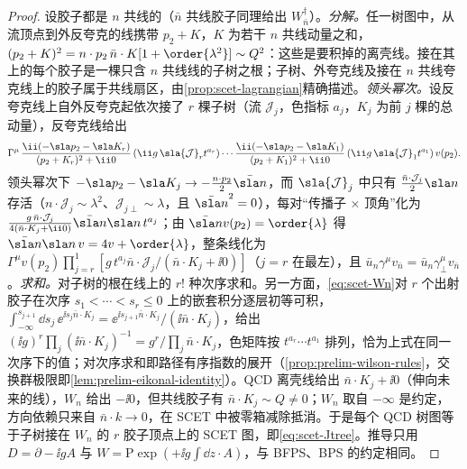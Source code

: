 \begin{proof}
设胶子都是 $n$ 共线的（$\bar n$ 共线胶子同理给出 $W_{\bar n}^\dagger$）。\emph{分解。}任一树图中，从流顶点到外反夸克的线携带 $p_2+K$，$K$ 为若干 $n$ 共线动量之和，$(p_2+K)^2=n\cdot p_2\,\bar n\cdot K[1+\order{\lambda^2}]\sim Q^2$：这些是要积掉的离壳线。接在其上的每个胶子是一棵只含 $n$ 共线线的子树之根；子树、外夸克线及接在 $n$ 共线夸克线上的胶子属于共线扇区，由\cref{prop:scet-lagrangian}精确描述。\emph{领头幂次。}设反夸克线上自外反夸克起依次接了 $r$ 棵子树（流 $\mathcal J_j$，色指标 $a_j$，$K_j$ 为前 $j$ 棵的总动量），反夸克线给出
\[
\Gamma^\mu\,\frac{\ii(-\sla p_2-\sla K_r)}{(p_2+K_r)^2+\ii0}\,(\ii g\,\sla{\mathcal J}_r t^{a_r})\cdots\frac{\ii(-\sla p_2-\sla K_1)}{(p_2+K_1)^2+\ii0}\,(\ii g\,\sla{\mathcal J}_1t^{a_1})\,v(p_2).
\]
领头幂次下 $-\sla p_2-\sla K_j\to-\frac{n\cdot p_2}{2}\bar{\sla n}$，而 $\sla{\mathcal J}_j$ 中只有 $\frac{\bar n\cdot\mathcal J_j}{2}\sla n$ 存活（$n\cdot\mathcal J_j\sim\lambda^2$、$\mathcal J_{j\perp}\sim\lambda$，且 $\bar{\sla n}^2=0$），每对“传播子 × 顶角”化为 $\frac{g\,\bar n\cdot\mathcal J_j}{4(\bar n\cdot K_j+\ii0)}\bar{\sla n}\sla n\,t^{a_j}$；由 $\bar{\sla n}v(p_2)=\order{\lambda}$ 得 $\bar{\sla n}\sla n\,v=4v+\order{\lambda}$，整条线化为 $\Gamma^\mu v(p_2)\prod_{j=r}^{1}[g\,t^{a_j}\bar n\cdot\mathcal J_j/(\bar n\cdot K_j+\ii0)]$（$j=r$ 在最左），且 $\bar u_n\gamma^\mu v_{\bar n}=\bar u_n\gamma_\perp^\mu v_{\bar n}$。\emph{求和。}对子树的根在线上的 $r!$ 种次序求和。另一方面，\cref{eq:scet-Wn}对 $r$ 个出射胶子在次序 $s_1<\cdots<s_r\le0$ 上的嵌套积分逐层初等可积，$\int_{-\infty}^{s_{j+1}}\dd s_j\,\ee^{\ii s_j\bar n\cdot K_j}=\ee^{\ii s_{j+1}\bar n\cdot K_j}/(\ii\bar n\cdot K_j)$，给出 $(\ii g)^r\prod_j(\ii\bar n\cdot K_j)^{-1}=g^r/\prod_j\bar n\cdot K_j$，色矩阵按 $t^{a_r}\cdots t^{a_1}$ 排列，恰为上式在同一次序下的值；对次序求和即路径有序指数的展开（\cref{prop:prelim-wilson-rules}，交换群极限即\cref{lem:prelim-eikonal-identity}）。QCD 离壳线给出 $\bar n\cdot K_j+\ii0$（伸向未来的线），$W_n$ 给出 $-\ii0$，但共线胶子有 $\bar n\cdot K_j\sim Q\neq0$；$W_n$ 取自 $-\infty$ 是约定，方向依赖只来自 $\bar n\cdot k\to0$，在 SCET 中被零箱减除抵消\cite{RothsteinStewart2016}。于是每个 QCD 树图等于子树接在 $W_n$ 的 $r$ 胶子顶点上的 SCET 图，即\cref{eq:scet-Jtree}。推导只用 $D=\partial-\ii gA$ 与 $W=\mathrm P\exp(+\ii g\int\dd z\cdot A)$，与 BFPS、BPS 的约定相同。
\end{proof}

